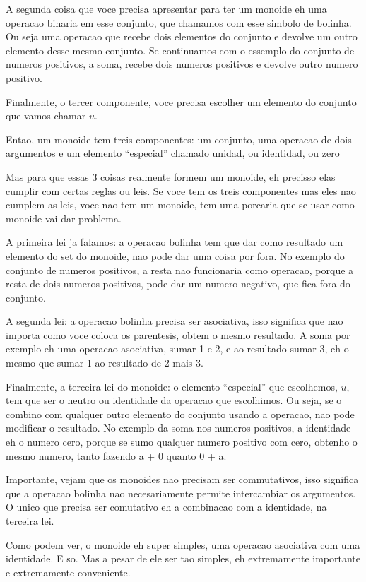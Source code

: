 \documentclass{beamer}
\begin{document}
\begin{frame}
{    A segunda coisa que voce precisa apresentar para ter um monoide eh uma
    operacao binaria em esse conjunto, que chamamos com esse simbolo de bolinha.
    Ou seja uma operacao que recebe dois
    elementos do conjunto e devolve um outro elemento desse mesmo conjunto. Se
    continuamos com o essemplo do conjunto de numeros positivos, a soma, recebe
    dois numeros positivos e devolve outro numero positivo.

    Finalmente, o tercer componente, voce precisa escolher um elemento do conjunto
    que vamos chamar \(u\).

    Entao, um monoide tem treis componentes: um conjunto, uma operacao de dois
    argumentos e um elemento ``especial'' chamado unidad, ou identidad, ou zero

    \hrulefill

    Mas para que essas 3 coisas realmente formem um monoide, eh precisso
    elas  cumplir com certas reglas ou leis. Se voce tem os treis componentes
    mas eles nao cumplem as leis, voce nao tem um monoide, tem uma porcaria que
    se usar como monoide vai dar problema.

    A primeira lei ja falamos: a operacao bolinha tem que dar como resultado um
    elemento do set do monoide, nao pode dar uma coisa por fora. No exemplo do conjunto
    de numeros positivos, a resta nao funcionaria como operacao, porque a resta
    de dois numeros positivos, pode dar um numero negativo, que fica fora do conjunto.

    A segunda lei: a operacao bolinha precisa ser asociativa, isso significa que
    nao importa como voce coloca os parentesis, obtem o mesmo resultado. A soma
    por exemplo eh uma operacao asociativa, sumar 1 e 2, e ao resultado sumar 3,
    eh o mesmo que sumar 1 ao resultado de 2 mais 3.

    Finalmente, a terceira lei do monoide: o elemento ``especial'' que
    escolhemos, \(u\), tem que ser o neutro ou identidade da operacao que
    escolhimos. Ou seja, se o combino com qualquer outro elemento do conjunto usando
    a operacao, nao pode modificar o resultado. No exemplo da soma nos numeros positivos, a identidade
    eh o numero cero, porque se sumo qualquer numero positivo com cero, obtenho
    o mesmo numero, tanto fazendo a + 0 quanto 0 + a.

    Importante, vejam que os monoides nao precisam ser commutativos, isso
    significa que a operacao bolinha nao necesariamente permite intercambiar os
    argumentos. O unico que precisa ser comutativo eh a combinacao com a
    identidade, na terceira lei.

    Como podem ver, o monoide eh super simples, uma operacao asociativa com uma
    identidade. E so. Mas a pesar de ele ser tao simples, eh extremamente
    importante e extremamente conveniente.
  }
\end{frame}
\end{document}
